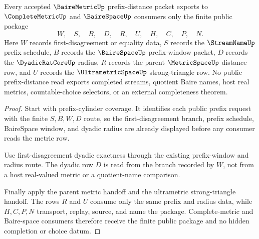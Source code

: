 \begin{theorem}
\label{thm:bairemetric-obligation-public-prefix-package}
Every accepted $\BaireMetricUp$ prefix-distance packet exports to $\CompleteMetricUp$ and $\BaireSpaceUp$ consumers only the finite public package
$$
W,\quad S,\quad B,\quad D,\quad R,\quad U,\quad H,\quad C,\quad P,\quad N .
$$
Here $W$ records first-disagreement or equality data, $S$ records the $\StreamNameUp$ prefix schedule, $B$ records the $\BaireSpaceUp$ prefix-window packet, $D$ records the $\DyadicRatCoreUp$ radius, $R$ records the parent $\MetricSpaceUp$ distance row, and $U$ records the $\UltrametricSpaceUp$ strong-triangle row. No public prefix-distance read exports completed streams, quotient Baire names, host real metrics, countable-choice selectors, or an external completeness theorem.
\end{theorem}
\begin{proof}
Start with prefix-cylinder coverage. It identifies each public prefix request with the finite $S,B,W,D$ route, so the first-disagreement branch, prefix schedule, BaireSpace window, and dyadic radius are already displayed before any consumer reads the metric row.

Use first-disagreement dyadic exactness through the existing prefix-window and radius route. The dyadic row $D$ is read from the branch recorded by $W$, not from a host real-valued metric or a quotient-name comparison.

Finally apply the parent metric handoff and the ultrametric strong-triangle handoff. The rows $R$ and $U$ consume only the same prefix and radius data, while $H,C,P,N$ transport, replay, source, and name the package. Complete-metric and Baire-space consumers therefore receive the finite public package and no hidden completion or choice datum.
\end{proof}

